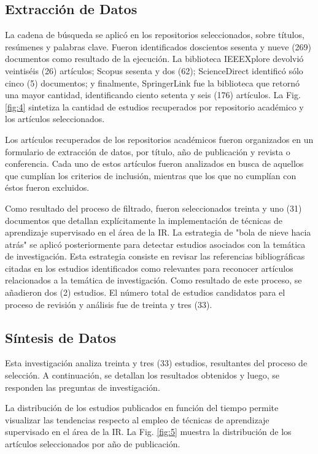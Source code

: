 \documentclass[journal]{IEEEtran}
\begin{document}
\subsection{Extracción de Datos}

La cadena de búsqueda se aplicó en los repositorios seleccionados, sobre títulos, resúmenes y palabras clave. Fueron identificados doscientos sesenta y nueve (269) documentos como resultado de la ejecución. La biblioteca IEEEXplore devolvió veintiséis (26) artículos; Scopus sesenta y dos (62); ScienceDirect identificó sólo cinco (5) documentos; y finalmente, SpringerLink fue la biblioteca que retornó una mayor cantidad, identificando ciento setenta y seis (176) artículos. La Fig. \ref{fig:4} sintetiza la cantidad de estudios recuperados por repositorio académico y los artículos seleccionados.

Los artículos recuperados de los repositorios académicos fueron organizados en un formulario de extracción de datos, por título, año de publicación y revista o conferencia. Cada uno de estos artículos fueron analizados en busca de aquellos que cumplían los criterios de inclusión, mientras que los que no cumplían con éstos fueron excluidos. 

Como resultado del proceso de filtrado, fueron seleccionados treinta y uno (31) documentos que detallan explícitamente la implementación de técnicas de aprendizaje supervisado en el área de la IR. La estrategia de "bola de nieve hacia atrás" \cite{wohlin2014guidelines} se aplicó posteriormente para detectar estudios asociados con la temática de investigación. Esta estrategia consiste en revisar las referencias bibliográficas citadas en los estudios identificados como relevantes para reconocer artículos relacionados a la temática de investigación. Como resultado de este proceso, se añadieron dos (2) estudios. El número total de estudios candidatos para el proceso de revisión y análisis fue de treinta y tres (33).

\subsection{Síntesis de Datos }

Esta investigación analiza treinta y tres (33) estudios, resultantes del proceso de selección. A continuación, se detallan los resultados obtenidos y luego, se responden las preguntas de investigación.

La distribución de los estudios publicados en función del tiempo permite visualizar las tendencias respecto al empleo de técnicas de aprendizaje supervisado en el área de la IR. La Fig. \ref{fig:5} muestra la distribución de los artículos seleccionados por año de publicación.
\end{document}
